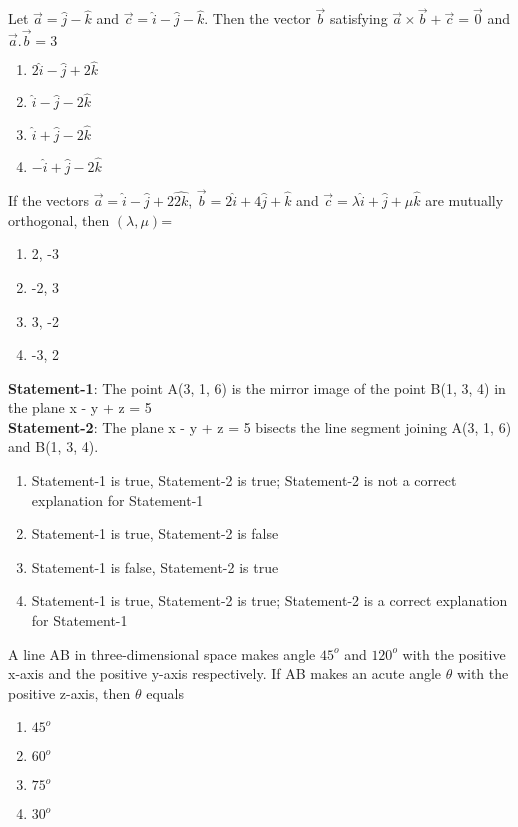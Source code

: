 \item Let $\overrightarrow{a} = \hat{j} - \hat{k}$ and $\overrightarrow{c} = \hat{i} - \hat{j} - \hat{k}$. Then the vector $\overrightarrow{b}$ satisfying $\overrightarrow{a} \times \overrightarrow{b} + \overrightarrow{c} =\overrightarrow{0}$ and $\overrightarrow{a}.\overrightarrow{b} = 3$
\begin{enumerate}
\item $2\hat{i} - \hat{j} + 2\hat{k}$
\item $\hat{i} - \hat{j} - 2\hat{k}$
\item $\hat{i} + \hat{j} - 2\hat{k}$
\item $-\hat{i} + \hat{j} - 2\hat{k}$
\end{enumerate}

\item If the vectors $\overrightarrow{a} = \hat{i} - \hat{j} + 2\hat{2k}$, $\overrightarrow{b} = 2\hat{i} + 4\hat{j} + \hat{k}$ and $\overrightarrow{c} = \lambda\hat{i} + \hat{j} + \mu\hat{k}$ are mutually orthogonal, then $(\lambda, \mu)$=
\begin{enumerate}
\item 2, -3
\item -2, 3
\item 3, -2
\item -3, 2
\end{enumerate}

\item \textbf{Statement-1}: The point A(3, 1, 6) is the mirror image of the point B(1, 3, 4) in the plane x - y + z = 5\\
\textbf{Statement-2}: The plane x - y + z = 5 bisects the line segment joining A(3, 1, 6) and B(1, 3, 4).
\begin{enumerate}
\item Statement-1 is true, Statement-2 is true; Statement-2 is not a correct explanation for Statement-1
\item Statement-1 is true, Statement-2 is false
\item Statement-1 is false, Statement-2 is true
\item Statement-1 is true, Statement-2 is true; Statement-2 is a correct explanation for Statement-1
\end{enumerate}

\item A line AB in three-dimensional space makes angle $45^{o}$ and $120^{o}$ with the positive x-axis and the positive y-axis respectively. If AB makes an acute angle $\theta$ with the positive z-axis, then $\theta$ equals
\begin{enumerate}
\item $45^{o}$
\item $60^{o}$
\item $75^{o}$
\item $30^{o}$
\end{enumerate}

